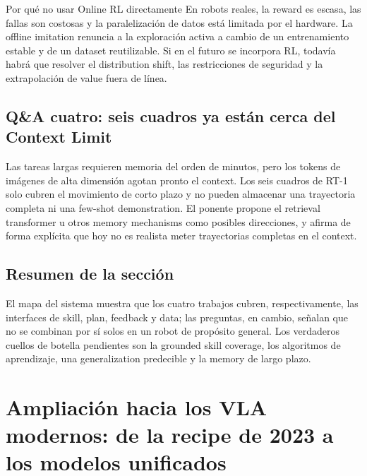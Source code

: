 \documentclass[a4paper]{article}
\begin{document}
\begin{knowledgebox}{Por qué no usar Online RL directamente}
En robots reales, la reward es escasa, las fallas son costosas y la paralelización de datos está limitada por el hardware. La offline imitation renuncia a la exploración activa a cambio de un entrenamiento estable y de un dataset reutilizable. Si en el futuro se incorpora RL, todavía habrá que resolver el distribution shift, las restricciones de seguridad y la extrapolación de value fuera de línea.
\end{knowledgebox}

\subsection{Q\&A cuatro: seis cuadros ya están cerca del Context Limit}

Las tareas largas requieren memoria del orden de minutos, pero los tokens de imágenes de alta dimensión agotan pronto el context. Los seis cuadros de RT-1 solo cubren el movimiento de corto plazo y no pueden almacenar una trayectoria completa ni una few-shot demonstration. El ponente propone el retrieval transformer u otros memory mechanisms como posibles direcciones, y afirma de forma explícita que hoy no es realista meter trayectorias completas en el context.


\subsection{Resumen de la sección}

El mapa del sistema muestra que los cuatro trabajos cubren, respectivamente, las interfaces de skill, plan, feedback y data; las preguntas, en cambio, señalan que no se combinan por sí solos en un robot de propósito general. Los verdaderos cuellos de botella pendientes son la grounded skill coverage, los algoritmos de aprendizaje, una generalization predecible y la memory de largo plazo.
\section{Ampliación hacia los VLA modernos: de la recipe de 2023 a los modelos unificados}
\end{document}
